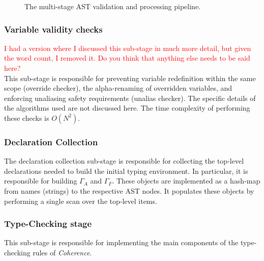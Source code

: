 \documentclass[a4paper,12pt,fleqn]{article}
\begin{document}
\begin{figure}[H]
{%
}
\caption{The multi-stage AST validation and processing pipeline.} 
\label{fig:ast-validation}
\end{figure}

\subsubsection{Variable validity checks} \label{sec:var-validity}
\textcolor{red}{I had a version where I discussed this sub-stage in much more detail, but given the word count, I removed it. Do you think that anything else needs to be said here?}\\
This sub-stage is responsible for preventing variable redefinition within the same scope (override checker), the alpha-renaming of overridden variables, and enforcing unaliasing safety requirements (unalias checker). The specific details of the algorithms used are not discussed here. The time complexity of performing these checks is $O(N^2)$.

\subsubsection{Declaration Collection}
The declaration collection sub-stage is responsible for collecting the top-level declarations needed to build the initial typing environment. In particular, it is responsible for building $\Gamma_A$ and $\Gamma_F$. These objects are implemented as a hash-map from names (strings) to the respective AST nodes. It populates these objects by performing a single scan over the top-level items.
\subsubsection{Type-Checking stage}
This sub-stage is responsible for implementing the main components of the type-checking rules of \textit{Coherence}.
\end{document}
